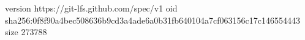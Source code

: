 version https://git-lfs.github.com/spec/v1
oid sha256:0f8f90a4bec508636b9cd3a4ade6a0b31fb640104a7cf063156c17c146554443
size 273788
